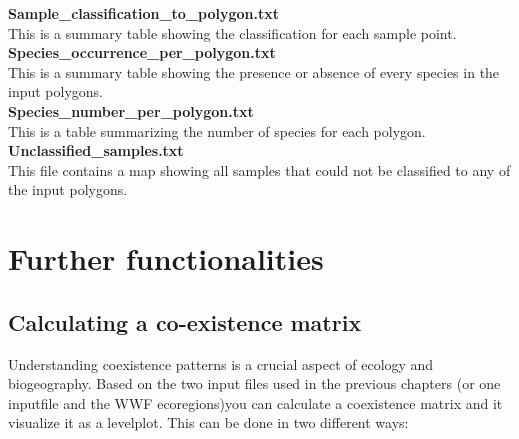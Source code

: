 \documentclass[a4paper,titlepage,11pt]{scrreprt}
\begin{document}
\textbf{Sample\_classification\_to\_polygon.txt}\\
This is a summary table showing the classification for each sample point.\\
\textbf{Species\_occurrence\_per\_polygon.txt}\\
This is a summary table showing the presence or absence of every species in the input polygons.\\
\textbf{Species\_number\_per\_polygon.txt}\\
This is a table summarizing the number of species for each polygon.\\
\textbf{Unclassified\_samples.txt}\\
This file contains a map showing all samples that could not be classified to any of the input polygons.\\

\chapter{Further functionalities} \label{further}
\section{Calculating a co-existence matrix} \label{coex}
Understanding coexistence patterns is a crucial aspect of ecology and biogeography. Based on the two input files used in the previous chapters (or one inputfile and the WWF ecoregions)you can calculate a coexistence matrix and it visualize it as a levelplot. This can be done in two different ways:
\end{document}
